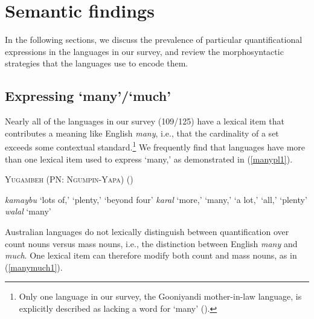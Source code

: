 \documentclass[12pt,egregdoesnotlikesansseriftitles]{scrartcl}
\makeatletter
\newcommand{\ofy}{/125} %
\makeatother
\begin{document}




\section{Semantic findings \label{individquantsection}}

In the following sections, we discuss the prevalence of particular quantificational expressions in the languages in our survey, and review the morphosyntactic strategies that the languages use to encode them.

\subsection{Expressing `many'/`much' \label{manymuchsection}}

Nearly all of the languages in our survey (109\ofy) have a lexical item that contributes a meaning like English \textit{many}, i.e., that the cardinality of a set exceeds some contextual standard.\footnote{Only one language in our survey, the Gooniyandi mother-in-law language, is explicitly described as lacking a word for `many' (\citealt[636]{mcgregor89}).} We frequently find that languages  have more than one lexical item used to express `many,' as demonstrated in (\ref{manypl1}). %

\begin{exe}
 \ex  \textsc{Yugambeh (PN: Ngumpin-Yapa)} \hfill(\citealt{sharpe98}) \label{manypl1}
  \begin{xlist}
    \ex \textit{kamaybu} `lots of,' `plenty,' `beyond four'
    \ex \textit{karal} `more,' `many,' `a lot,' `all,' `plenty'
    \ex \textit{walal}  `many' 
  \end{xlist} 
\end{exe}

Australian languages do not lexically distinguish between quantification over count nouns versus mass nouns, i.e., the distinction between English \textit{many} and \textit{much}. One lexical item can therefore modify both count and mass nouns, as in (\ref{manymuch1}).
\end{document}
